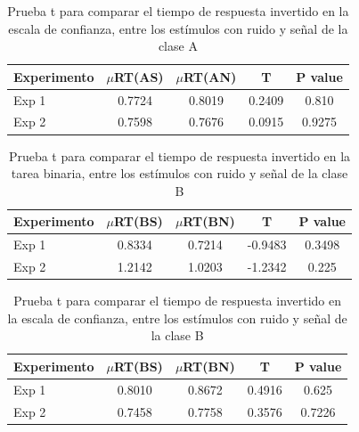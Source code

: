 \begin{table}[h]
\caption[Prueba t para comparar el tiempo de respuesta invertido en la escala de confianza, entre los estímulos con ruido y señal de la clase A]{Prueba t para comparar el tiempo de respuesta invertido en la escala de confianza, entre los estímulos con ruido y señal de la clase A}
\label{Tabla_RT2_A}
\centering
\begin{tabular}{l | c c c c}
\toprule
\textbf{Experimento} & \textbf{$\mu$RT(AS)} & \textbf{$\mu$RT(AN)} & \textbf{T} & \textbf{P value}\\
\midrule
Exp 1 & 0.7724 & 0.8019 & 0.2409 & 0.810 \\
Exp 2 & 0.7598 & 0.7676 & 0.0915 & 0.9275  \\
\bottomrule
\end{tabular}
\end{table}


\begin{table}[h]
\caption[Prueba t para comparar el tiempo de respuesta invertido en la tarea binaria, entre los estímulos con ruido y señal de la clase B]{Prueba t para comparar el tiempo de respuesta invertido en la tarea binaria, entre los estímulos con ruido y señal de la clase B}
\label{Tabla_RT1_B}
\centering
\begin{tabular}{l |  c c c c}
\toprule
\textbf{Experimento} & \textbf{$\mu$RT(BS)} & \textbf{$\mu$RT(BN)} & \textbf{T} & \textbf{P value}\\
\midrule
Exp 1 & 0.8334 & 0.7214 & -0.9483 & 0.3498 \\
Exp 2 & 1.2142 & 1.0203 & -1.2342 & 0.225  \\
\bottomrule
\end{tabular}
\end{table}

\begin{table}[th]
\caption[Prueba t para comparar el tiempo de respuesta invertido en la escala de confianza, entre los estímulos con ruido y señal de la clase B]{Prueba t para comparar el tiempo de respuesta invertido en la escala de confianza, entre los estímulos con ruido y señal de la clase B}
\label{Tabla_RT2_B}
\centering
\begin{tabular}{l |  c c c c}
\toprule
\textbf{Experimento} & \textbf{$\mu$RT(BS)} & \textbf{$\mu$RT(BN)} & \textbf{T} & \textbf{P value}\\
\midrule
Exp 1 & 0.8010 & 0.8672 & 0.4916 & 0.625 \\
Exp 2 & 0.7458 & 0.7758 & 0.3576 & 0.7226  \\
\bottomrule
\end{tabular}
\end{table}
